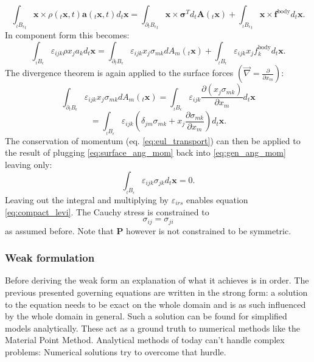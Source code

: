 \documentclass[m,times]{cgMA}
\begin{document}
\begin{equation}
\int _ {_tB _ { \epsilon}  } _t\boldsymbol{x} \times \rho ( _t\boldsymbol{x} , t ) \boldsymbol{a} ( _t\boldsymbol{x} , t ) d _t\boldsymbol{x} = \int _ { \partial _tB _ {\epsilon  } }_t\boldsymbol{x} \times  \boldsymbol{\sigma}^T d_t\boldsymbol{A} (_t\boldsymbol{x} ) + \int _ { _tB_\epsilon }_t\boldsymbol{x} \times  \boldsymbol{f} ^ {\text{body} } d _t\boldsymbol{x}.
\end{equation}
In component form this becomes:
\begin{equation}\label{eq:gen_ang_mom}
  \int _ {_tB _ { \epsilon}  } \varepsilon_{ijk} \rho x_j a_k d _t\boldsymbol{x} = \int _ { \partial _tB _ {\epsilon  } } \varepsilon_{ijk} x_j \sigma_{mk} dA_m(_t\boldsymbol{x} ) + \int _ { _tB_\epsilon } \varepsilon_{ijk} x_j f_k ^ {\text{body} } d _t\boldsymbol{x}.
\end{equation}
The divergence theorem is again applied to the surface forces $\left(\vec{\nabla} = \frac{\partial}{\partial x_m}\right)$:
$$
\int _ { \partial _tB _ {\epsilon  } } \varepsilon_{ijk} x_j \sigma_{mk} dA_m (_t\boldsymbol{x} ) =
\int _ {_tB _ {\epsilon  } } \varepsilon_{ijk} \frac{\partial(x_j \sigma_{mk})}{\partial x_m} d_t\boldsymbol{x}
$$
\begin{equation}\label{eq:surface_ang_mom}
  = \int _ {_tB _ {\epsilon  } } \varepsilon_{ijk} \left(\delta_{jm} \sigma_{mk}+ x_j\frac{ \partial \sigma_{mk}}{\partial x_m}\right) d_t\boldsymbol{x}.
\end{equation}
The conservation of momentum (eq. \ref{eq:eul_transport}) can then be applied to the result of plugging \ref{eq:surface_ang_mom} back into \ref{eq:gen_ang_mom} leaving only:
\begin{equation}
  \int _ {_tB _ {\epsilon  } } \varepsilon_{ijk} \sigma_{jk} d_t\boldsymbol{x} = 0.
\end{equation}
Leaving out the integral and multiplying by ${\varepsilon_{irs}}$ enables equation \ref{eq:compact_levi}. The Cauchy stress is constrained to
\begin{equation}
  \sigma_{ij} =\sigma_{ji}
\end{equation}
as assumed before. Note that $\boldsymbol{P}$ however is not constrained to be symmetric.
\begin{flushright}\cite{MPM:COURSE}\cite{MIT:CONTINUUM_MECHANICS}\end{flushright}
\subsubsection{Weak formulation}\label{sec:weak}
Before deriving the weak form an explanation of what it achieves is in order. The previous presented governing equations are written in the strong form: a solution to the equation needs to be exact on the whole domain and is as such influenced by the whole domain in general. Such a solution can be found for simplified models analytically. These act as a ground truth to numerical methods like the Material Point Method. Analytical methods of today can't handle complex problems: Numerical solutions try to overcome that hurdle.
\end{document}
